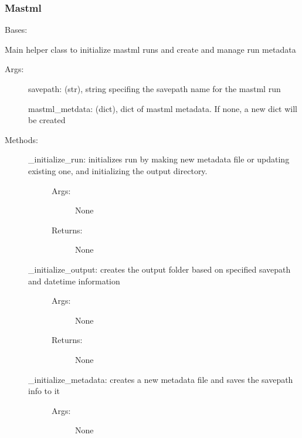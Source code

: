 \documentclass[letterpaper,10pt,english]{sphinxmanual}
\begin{document}
\subsubsection{Mastml}
\label{\detokenize{api/mastml.mastml.Mastml:mastml}}\label{\detokenize{api/mastml.mastml.Mastml::doc}}

\begin{fulllineitems}
\label{\detokenize{api/mastml.mastml.Mastml:mastml.mastml.Mastml}}
Bases: 

Main helper class to initialize mastml runs and create and manage run metadata
\begin{description}
\item[{Args:}] \leavevmode
savepath: (str), string specifing the savepath name for the mastml run

mastml\_metdata: (dict), dict of mastml metadata. If none, a new dict will be created

\item[{Methods:}] \leavevmode\begin{description}
\item[{\_initialize\_run: initializes run by making new metadata file or updating existing one, and initializing the output directory.}] \leavevmode\begin{description}
\item[{Args:}] \leavevmode
None

\item[{Returns:}] \leavevmode
None

\end{description}

\item[{\_initialize\_output: creates the output folder based on specified savepath and datetime information}] \leavevmode\begin{description}
\item[{Args:}] \leavevmode
None

\item[{Returns:}] \leavevmode
None

\end{description}

\item[{\_initialize\_metadata: creates a new metadata file and saves the savepath info to it}] \leavevmode\begin{description}
\item[{Args:}] \leavevmode
None


\end{description}
\end{description}
\end{description}
\end{fulllineitems}
\end{document}
